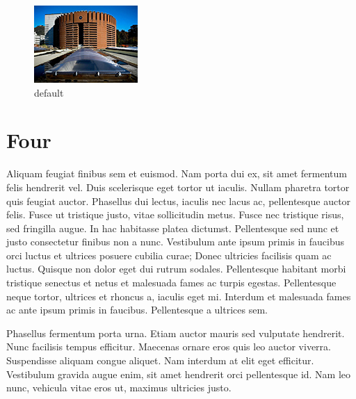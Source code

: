 \begin{figure}[htbp]
\begin{center}
\includegraphics{figures/image}
\caption{default}
\label{default}
\end{center}
\end{figure}



\section{Four}
Aliquam feugiat finibus sem et euismod. Nam porta dui ex, sit amet fermentum felis hendrerit vel. Duis scelerisque eget tortor ut iaculis. Nullam pharetra tortor quis feugiat auctor. Phasellus dui lectus, iaculis nec lacus ac, pellentesque auctor felis. Fusce ut tristique justo, vitae sollicitudin metus. Fusce nec tristique risus, sed fringilla augue. In hac habitasse platea dictumst. Pellentesque sed nunc et justo consectetur finibus non a nunc. Vestibulum ante ipsum primis in faucibus orci luctus et ultrices posuere cubilia curae; Donec ultricies facilisis quam ac luctus. Quisque non dolor eget dui rutrum sodales. Pellentesque habitant morbi tristique senectus et netus et malesuada fames ac turpis egestas. Pellentesque neque tortor, ultrices et rhoncus a, iaculis eget mi. Interdum et malesuada fames ac ante ipsum primis in faucibus. Pellentesque a ultrices sem.

Phasellus fermentum porta urna. Etiam auctor mauris sed vulputate hendrerit. Nunc facilisis tempus efficitur. Maecenas ornare eros quis leo auctor viverra. Suspendisse aliquam congue aliquet. Nam interdum at elit eget efficitur. Vestibulum gravida augue enim, sit amet hendrerit orci pellentesque id. Nam leo nunc, vehicula vitae eros ut, maximus ultricies justo.

